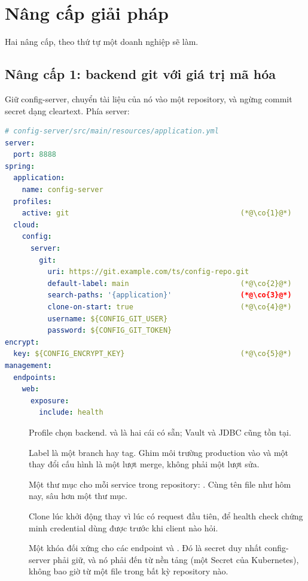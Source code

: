 \section{Nâng cấp giải pháp}
\label{sec:config-enhance}

Hai nâng cấp, theo thứ tự một doanh nghiệp sẽ làm.

\subsection{Nâng cấp 1: backend git với giá trị mã hóa}

Giữ config-server, chuyển tài liệu của nó vào một repository, và ngừng
commit secret dạng cleartext. Phía server:

\begin{lstlisting}[language=yaml]
# config-server/src/main/resources/application.yml
server:
  port: 8888
spring:
  application:
    name: config-server
  profiles:
    active: git                                        (*@\co{1}@*)
  cloud:
    config:
      server:
        git:
          uri: https://git.example.com/ts/config-repo.git
          default-label: main                          (*@\co{2}@*)
          search-paths: '{application}'                (*@\co{3}@*)
          clone-on-start: true                         (*@\co{4}@*)
          username: ${CONFIG_GIT_USER}
          password: ${CONFIG_GIT_TOKEN}
encrypt:
  key: ${CONFIG_ENCRYPT_KEY}                           (*@\co{5}@*)
management:
  endpoints:
    web:
      exposure:
        include: health
\end{lstlisting}

\begin{description}
  \item[] Profile chọn backend.  và  là hai
  cái có sẵn; Vault và JDBC cũng tồn tại.
  \item[] Label là một branch hay tag. Ghim môi trường production
  vào  và một thay đổi cấu hình là một lượt merge,
  không phải một lượt sửa.
  \item[] Một thư mục cho mỗi service trong repository:
  . Cùng tên file như hôm nay, sâu
  hơn một thư mục.
  \item[] Clone lúc khởi động thay vì lúc có request đầu tiên, để
  health check chứng minh credential dùng được trước khi client nào
  hỏi.
  \item[] Một khóa đối xứng cho các endpoint  và
  . Đó là secret duy nhất config-server phải giữ, và nó
  phải đến từ nền tảng (một Secret của Kubernetes), không bao giờ từ một
  file trong bất kỳ repository nào.
\end{description}

